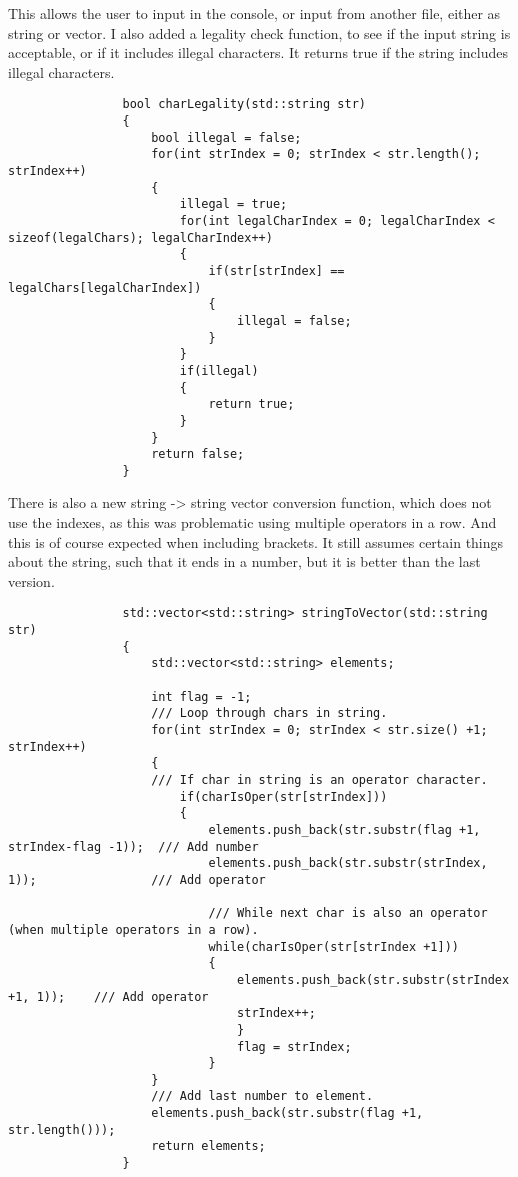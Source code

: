 \documentclass{article}
\begin{document}
			This allows the user to input in the console, or input from another file, either as string or vector.
			I also added a legality check function, to see if the input string is acceptable, or if it includes illegal characters. It returns true if the string includes illegal characters.
			\begin{lstlisting}
				bool charLegality(std::string str)
				{
					bool illegal = false;
					for(int strIndex = 0; strIndex < str.length(); strIndex++)
					{
						illegal = true;
						for(int legalCharIndex = 0; legalCharIndex < sizeof(legalChars); legalCharIndex++)
						{
							if(str[strIndex] == legalChars[legalCharIndex])
							{
								illegal = false;
							}
						}
						if(illegal)
						{
							return true;
						}
					}
					return false;
				}
			\end{lstlisting}
			
			There is also a new string -> string vector conversion function, which does not use the indexes, as this was problematic using multiple operators in a row. And this is of course expected when including brackets. It still assumes certain things about the string, such that it ends in a number, but it is better than the last version.
			\begin{lstlisting}
				std::vector<std::string> stringToVector(std::string str)
				{
					std::vector<std::string> elements;
					
					int flag = -1;
					/// Loop through chars in string.
					for(int strIndex = 0; strIndex < str.size() +1; strIndex++)
					{
					/// If char in string is an operator character.
						if(charIsOper(str[strIndex]))
						{
							elements.push_back(str.substr(flag +1, strIndex-flag -1));  /// Add number
							elements.push_back(str.substr(strIndex, 1));                /// Add operator
							
							/// While next char is also an operator (when multiple operators in a row).
							while(charIsOper(str[strIndex +1]))
							{
								elements.push_back(str.substr(strIndex +1, 1));    /// Add operator
								strIndex++;
								}
								flag = strIndex;
							}
					}
					/// Add last number to element.
					elements.push_back(str.substr(flag +1, str.length()));
					return elements;
				}
			\end{lstlisting}
			
\end{document}
